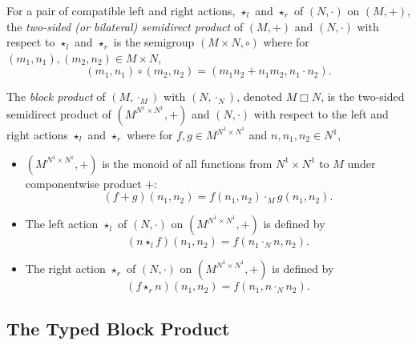\documentclass[a4paper,UKenglish,cleveref, autoref, thm-restate, anonymous]{lipics-v2021}
\begin{document}
\begin{definition}
    For a pair of compatible left and right actions, $\star_l$ and $\star_r$ of $(N, \cdot)$ on $(M, +)$, the \emph{two-sided (or bilateral) semidirect product} of $(M, +)$ and $(N, \cdot)$ with respect to $\star_l$ and $\star_r$ is the semigroup $(M \times N, \circ)$ where for $(m_1,n_1),(m_2,n_2) \in M \times N$, \[
        (m_1,n_1) \circ (m_2,n_2) = (m_1n_2 + n_1m_2, n_1 \cdot n_2).
    \]
\end{definition}

\begin{definition}
    The \emph{block product} of $(M, \cdot_M)$ with $(N, \cdot_N)$, denoted $M \Box N$, is the two-sided semidirect product of $(M^{N^1 \times N^1}, +)$ and $(N, \cdot)$ with respect to the left and right actions $\star_l$ and $\star_r$ where for $f,g \in M^{N^1 \times N^1}$ and $n,n_1,n_2 \in N^1$,
    \begin{itemize}
        \item $(M^{N^1 \times N^1}, +)$ is the monoid of all functions from $N^1 \times N^1$ to $M$ under componentwise product $+$: \[
            (f + g)(n_1,n_2) = f(n_1,n_2) \cdot_M g(n_1,n_2).
        \]
        \item The left action $\star_l$ of $(N, \cdot)$ on $(M^{N^1 \times N^1}, +)$ is defined by \[
            (n \star_l f)(n_1, n_2) = f(n_1 \cdot_N n, n_2).
        \]
        \item The right action $\star_r$ of $(N, \cdot)$ on $(M^{N^1 \times N^1}, +)$ is defined by \[
            (f \star_r n)(n_1, n_2) = f(n_1, n \cdot_N n_2).
        \]
    \end{itemize}
\end{definition}

\subsection{The Typed Block Product}
\end{document}
